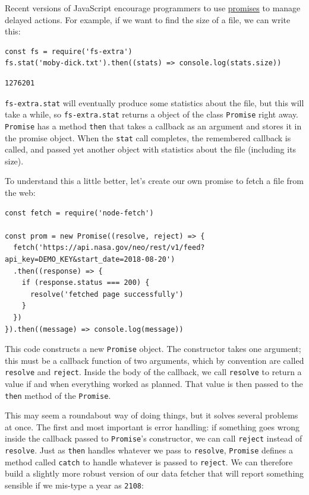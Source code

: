 Recent versions of JavaScript encourage programmers to use
\protect\hyperlink{g:promise}{promises} to manage delayed actions. For
example, if we want to find the size of a file, we can write this:

\begin{verbatim}
const fs = require('fs-extra')
fs.stat('moby-dick.txt').then((stats) => console.log(stats.size))
\end{verbatim}

\begin{verbatim}
1276201
\end{verbatim}

\texttt{fs-extra.stat} will eventually produce some statistics about the
file, but this will take a while, so \texttt{fs-extra.stat} returns a
object of the class \texttt{Promise} right away. \texttt{Promise} has a
method \texttt{then} that takes a callback as an argument and stores it
in the promise object. When the \texttt{stat} call completes, the
remembered callback is called, and passed yet another object with
statistics about the file (including its size).

To understand this a little better, let's create our own promise to
fetch a file from the web:

\begin{verbatim}
const fetch = require('node-fetch')

const prom = new Promise((resolve, reject) => {
  fetch('https://api.nasa.gov/neo/rest/v1/feed?api_key=DEMO_KEY&start_date=2018-08-20')
  .then((response) => {
    if (response.status === 200) {
      resolve('fetched page successfully')
    }
  })
}).then((message) => console.log(message))
\end{verbatim}

This code constructs a new \texttt{Promise} object. The constructor
takes one argument; this must be a callback function of two arguments,
which by convention are called \texttt{resolve} and \texttt{reject}.
Inside the body of the callback, we call \texttt{resolve} to return a
value if and when everything worked as planned. That value is then
passed to the \texttt{then} method of the \texttt{Promise}.

This may seem a roundabout way of doing things, but it solves several
problems at once. The first and most important is error handling: if
something goes wrong inside the callback passed to \texttt{Promise}'s
constructor, we can call \texttt{reject} instead of \texttt{resolve}.
Just as \texttt{then} handles whatever we pass to \texttt{resolve},
\texttt{Promise} defines a method called \texttt{catch} to handle
whatever is passed to \texttt{reject}. We can therefore build a slightly
more robust version of our data fetcher that will report something
sensible if we mis-type a year as \texttt{2108}:

